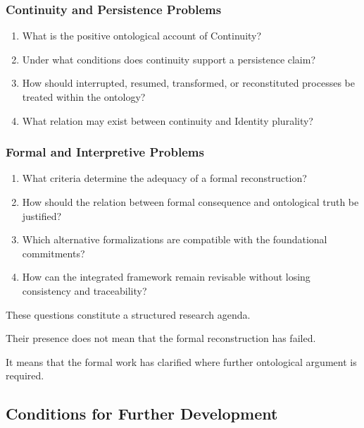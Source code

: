 \subsubsection{Continuity and Persistence Problems}

\begin{enumerate}
    \item What is
    the positive
    ontological account
    of Continuity?

    \item Under what
    conditions does
    continuity support
    a persistence
    claim?

    \item How should
    interrupted, resumed,
    transformed, or
    reconstituted processes
    be treated
    within the
    ontology?

    \item What relation
    may exist
    between continuity
    and Identity
    plurality?
\end{enumerate}

\subsubsection{Formal and Interpretive Problems}

\begin{enumerate}
    \item What criteria
    determine the
    adequacy of
    a formal
    reconstruction?

    \item How should
    the relation
    between formal
    consequence and
    ontological truth
    be justified?

    \item Which alternative
    formalizations are
    compatible with
    the foundational
    commitments?

    \item How can
    the integrated
    framework remain
    revisable without
    losing consistency
    and traceability?
\end{enumerate}

These questions constitute
a structured research
agenda.

Their presence does
not mean that
the formal reconstruction
has failed.

It means that
the formal work
has clarified
where further
ontological argument
is required.

\subsection{Conditions for Further Development}

